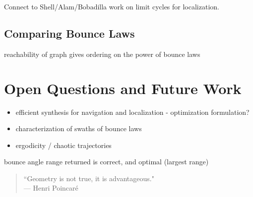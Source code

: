 \documentclass[]{svproc}  %
\begin{document}
Connect to Shell/Alam/Bobadilla work on limit cycles for localization.

\subsection{Comparing Bounce Laws}

\begin{theorem}
reachability of graph gives ordering on the power of bounce laws
\end{theorem}


\section{Open Questions and Future Work}



{\color{red} 
\begin{itemize}
\item efficient synthesis for navigation and localization - optimization formulation?
\item characterization of swaths of bounce laws
\item ergodicity / chaotic trajectories
\end{itemize}
}

\begin{corollary} bounce angle range returned is correct, and optimal
   (largest range)
\end{corollary}


%
%
%
\iffalse

{\small
\begin{center}
\begin{quotation}
``Geometry is not true, it is advantageous." \\
\hfill    --- Henri Poincar\'e
\end{quotation}
\end{center}
}
\end{document}
